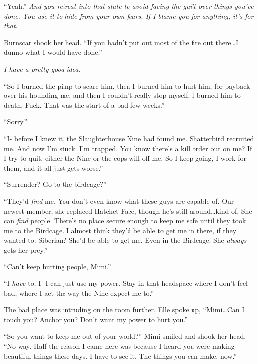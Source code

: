 ``Yeah.''  \emph{And you retreat into that state to avoid facing the guilt over things you've done.  You use it to hide from your own fears.  If I blame you for anything, it's for that}.



Burnscar shook her head.  ``If you hadn't put out most of the fire out there\ldots I dunno what I would have done.''



\emph{I have a pretty good idea.}



``So I burned the pimp to scare him, then I burned him to hurt him, for payback over his hounding me, and then I couldn't really stop myself.  I burned him to death.  Fuck. That was the start of a bad few weeks.''



``Sorry.''



``I- before I knew it, the Slaughterhouse Nine had found me.  Shatterbird recruited me.  And now I'm stuck.  I'm trapped.  You know there's a kill order out on me?  If I try to quit, either the Nine or the cops will off me.  So I keep going, I work for them, and it all just gets worse.''



``Surrender?  Go to the birdcage?''



``They'd \emph{find} me.  You don't even know what these guys are capable of.  Our newest member, she replaced Hatchet Face, though he's still around\ldots kind of.  She can \emph{find} people.  There's no place secure enough to keep me safe until they took me to the Birdcage.  I almost think they'd be able to get me in there, if they wanted to.  Siberian?  She'd be able to get me.   Even in the Birdcage.  She \emph{always} gets her prey.''



``Can't keep hurting people, Mimi.''



``I \emph{have} to.  I- I can just use my power.  Stay in that headspace where I don't feel bad, where I act the way the Nine expect me to.''



The bad place was intruding on the room further.  Elle spoke up, ``Mimi\ldots  Can I touch you?  Anchor you?  Don't want my power to hurt you.''



``So you want to keep me out of your world?''  Mimi smiled and shook her head.  ``No way.  Half the reason I came here was because I heard you were making beautiful things these days.  I have to see it.  The things you can make, now.''



